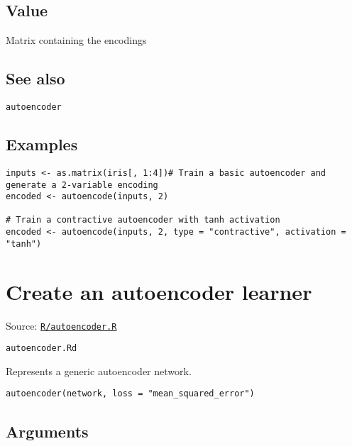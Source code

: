 \hypertarget{value}{\subsection{\texorpdfstring{\protect\hyperlink{value}{}Value}{Value}}\label{value}}

Matrix containing the encodings

\hypertarget{see-also}{\subsection{\texorpdfstring{\protect\hyperlink{see-also}{}See
also}{See also}}\label{see-also}}

\texttt{autoencoder}

\hypertarget{examples}{\subsection{\texorpdfstring{\protect\hyperlink{examples}{}Examples}{Examples}}\label{examples}}

\begin{verbatim}
inputs <- as.matrix(iris[, 1:4])# Train a basic autoencoder and generate a 2-variable encoding
encoded <- autoencode(inputs, 2)

# Train a contractive autoencoder with tanh activation
encoded <- autoencode(inputs, 2, type = "contractive", activation = "tanh")
\end{verbatim}

\section{Create an autoencoder
learner}\label{create-an-autoencoder-learner}

Source:
\href{https://github.com/fdavidcl/ruta/blob/master/R/autoencoder.R}{\texttt{R/autoencoder.R}}

\texttt{autoencoder.Rd}

Represents a generic autoencoder network.

\begin{verbatim}
autoencoder(network, loss = "mean_squared_error")
\end{verbatim}

\hypertarget{arguments}{\subsection{\texorpdfstring{\protect\hyperlink{arguments}{}Arguments}{Arguments}}\label{arguments}}

